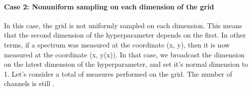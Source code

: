 \documentclass[letterpaper,10pt,english]{sphinxmanual}
\begin{document}
\paragraph{Case 2: Non\sphinxhyphen{}uniform sampling on each dimension of the grid}
\label{\detokenize{source/normalization:case-2-non-uniform-sampling-on-each-dimension-of-the-grid}}
\sphinxAtStartPar
In this case, the grid is not uniformly sampled on each dimension. This means that the second dimension of the hyperparameter depends on the first. In other terms, if a spectrum was measured at the coordinate (x, y), then it is now measured at the coordinate (x, y(x)). In that case, we broadcast the dimension on the latest dimension of the hyperparameter, and set it’s normal dimension to 1. Let’s consider a total of  measures performed on the grid. The number of channels is still .
\end{document}
